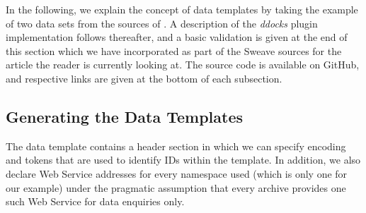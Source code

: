 \documentclass{acm_proc_article-sp}
\begin{document}
In the following, we explain the concept of data templates by taking the example of two data sets from the sources of \cite{KoenkerZeileis2009}. 
A description of the \textit{ddocks} plugin implementation follows thereafter,
and a basic validation is given at the end of this section which we have incorporated as part of the Sweave sources for the article the reader is currently looking at.
The source code is available on GitHub, and respective links are given at the bottom of each subsection.



\subsection{Generating the Data Templates}

The data template contains a header section in which we can specify encoding and tokens that are used to identify IDs within the template.
In addition, we also declare Web Service addresses for every namespace used (which is only one for our example) under the pragmatic assumption that every archive provides one such Web Service for data enquiries only.
\end{document}
